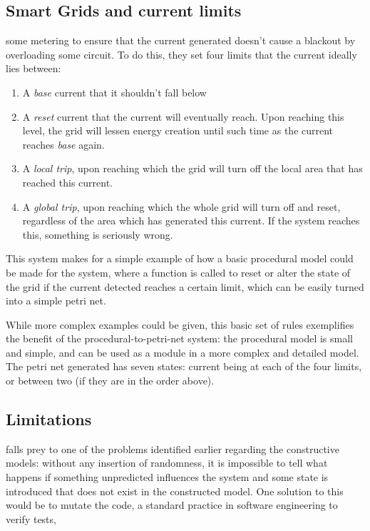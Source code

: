 \documentclass{tufte-handout}
\begin{document}
\subsection{Smart Grids and current limits}
some metering to ensure that the current generated doesn't cause a blackout by overloading some circuit. To do this, they set four limits that the current ideally lies between:
\begin{enumerate}
    \item {}A \emph{base} current that it shouldn't fall below
    \item A \emph{reset} current that the current will eventually reach. Upon reaching this level, the grid will lessen energy creation until such time as the current reaches \emph{base} again.
    \item A \emph{local trip}, upon reaching which the grid will turn off the local area that has reached this current.
    \item A \emph{global trip}, upon reaching which the whole grid will turn off and reset, regardless of the area which has generated this current. If the system reaches this, something is seriously wrong. 
\end{enumerate}\par
This system makes for a simple example of how a basic procedural model could be made for the system, where a function is called to reset or alter the state of the grid if the current detected reaches a certain limit, which can be easily turned into a simple petri net. \par
While more complex examples could be given, this basic set of rules exemplifies the benefit of the procedural-to-petri-net system: the procedural model is small and simple, and can be used as a module in a more complex and detailed model. The petri net generated has seven states: current being at each of the four limits, or between two (if they are in the order above).\par

\subsection{Limitations}
falls prey to one of the problems identified earlier regarding the constructive models: without any insertion of randomness, it is impossible to tell what happens if something unpredicted influences the system and some state is introduced that does not exist in the constructed model. One solution to this would be to mutate the code, a standard practice in software engineering to verify tests, 
\end{document}
